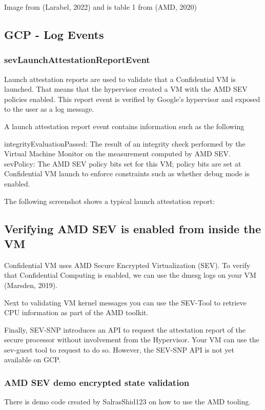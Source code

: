Image from (Larabel, 2022) and is table 1 from (AMD, 2020)

\subsection*{GCP - Log Events}

\subsubsection*{sevLaunchAttestationReportEvent}
Launch attestation reports are used to validate that a Confidential VM is launched. That means that the hypervisor created a VM with the AMD SEV policies enabled. This report event is verified by Google’s hypervisor and exposed to the user as a log message.

A launch attestation report event contains information such as the following

integrityEvaluationPassed: The result of an integrity check performed by the Virtual Machine Monitor on the measurement computed by AMD SEV.
sevPolicy: The AMD SEV policy bits set for this VM; policy bits are set at Confidential VM launch to enforce constraints such as whether debug mode is enabled.

The following screenshot shows a typical launch attestation report:


\subsection*{Verifying AMD SEV is enabled from inside the VM }
Confidential VM uses AMD Secure Encrypted Virtualization (SEV). To verify that Confidential Computing is enabled, we can use the dmesg logs on your VM (Marsden, 2019). 

Next to validating VM kernel messages you can use the SEV-Tool to retrieve CPU information as part of the AMD toolkit.

Finally, SEV-SNP introduces an API to request the attestation report of the secure processor without involvement from the Hypervisor. Your VM can use the sev-guest tool to request to do so. However, the SEV-SNP API is not yet available on GCP.

\subsubsection*{AMD SEV demo encrypted state validation}
There is demo code created by SalrasShid123 on how to use the AMD tooling. 